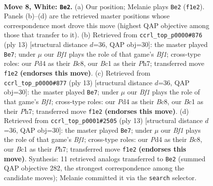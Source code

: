 \documentclass[11pt]{article}
\begin{document}
\begin{figure}[p]\centering
\begin{subfigure}{0.46\textwidth}\centering
\resizebox{\linewidth}{!}{%
\newchessgame
\chessboard[
  setfen={rnbq1rk1/pp2bppp/4pn2/2Pp4/3P4/2N2N2/PP3PPP/R1BQKB1R w KQ - 1 8},
  showmover=false,
  pgfstyle=straightmove, color=movearrow, markmove={f1-e2}
]}
\caption{}
\end{subfigure}\hfill
\begin{subfigure}{0.46\textwidth}\centering
\resizebox{\linewidth}{!}{%
\newchessgame
\chessboard[
  setfen={r1bqkb1r/pp3ppp/2n2n2/2pp4/3P4/5NP1/PPP2PBP/RNBQ1RK1 b kq - 2 7},
  showmover=false,
  pgfstyle=straightmove, color=movearrow, markmove={f8-e7}
]}
\caption{}
\end{subfigure}
\\[4pt]
\begin{subfigure}{0.46\textwidth}\centering
\resizebox{\linewidth}{!}{%
\newchessgame
\chessboard[
  setfen={r1bqkb1r/pp3ppp/2n2n2/2pp4/3P4/5NP1/PPP2PBP/RNBQ1RK1 b kq - 2 7},
  showmover=false,
  pgfstyle=straightmove, color=movearrow, markmove={f8-e7}
]}
\caption{}
\end{subfigure}\hfill
\begin{subfigure}{0.46\textwidth}\centering
\resizebox{\linewidth}{!}{%
\newchessgame
\chessboard[
  setfen={r1bqkb1r/pp3ppp/2n2n2/2pp4/3P4/5NP1/PPP2PBP/RNBQ1RK1 b kq - 2 7},
  showmover=false,
  pgfstyle=straightmove, color=movearrow, markmove={f8-e7}
]}
\caption{}
\end{subfigure}
\caption{\textbf{Move 8, White: \texttt{Be2}.} (a) Our position; Melanie plays \texttt{Be2} (\texttt{f1e2}). Panels (b)--(d) are the retrieved master positions whose correspondence most drove this move (highest QAP objective among those that transfer to it). (b) Retrieved from \texttt{ccrl\_top\_p0000\#876} (ply 13) [structural distance $d$=36, QAP obj=30]: the master played \texttt{Be7}; under $\mu$ our \emph{Bf1} plays the role of that game's \emph{Bf1}; cross-type roles: our \emph{P}d4 as their \emph{B}c8, our \emph{B}c1 as their \emph{P}h7; transferred move \texttt{f1e2} \textbf{(endorses this move)}. (c) Retrieved from \texttt{ccrl\_top\_p0000\#877} (ply 13) [structural distance $d$=36, QAP obj=30]: the master played \texttt{Be7}; under $\mu$ our \emph{Bf1} plays the role of that game's \emph{Bf1}; cross-type roles: our \emph{P}d4 as their \emph{B}c8, our \emph{B}c1 as their \emph{P}h7; transferred move \texttt{f1e2} \textbf{(endorses this move)}. (d) Retrieved from \texttt{ccrl\_top\_p0001\#2505} (ply 13) [structural distance $d$=36, QAP obj=30]: the master played \texttt{Be7}; under $\mu$ our \emph{Bf1} plays the role of that game's \emph{Bf1}; cross-type roles: our \emph{P}d4 as their \emph{B}c8, our \emph{B}c1 as their \emph{P}h7; transferred move \texttt{f1e2} \textbf{(endorses this move)}. Synthesis: 11 retrieved analogs transferred to \texttt{Be2} (summed QAP objective 282, the strongest correspondence among the candidate moves); Melanie committed it via the \texttt{search} selector.}
\label{fig:thought-m14}
\end{figure}
\end{document}
